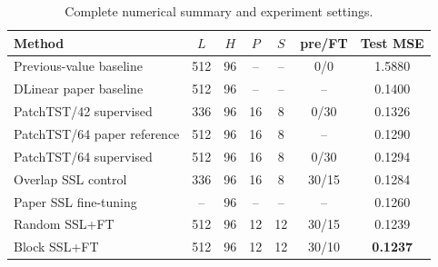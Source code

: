 \documentclass[11pt,twocolumn]{article}
\begin{document}
\begin{table}[H]
\centering
\scriptsize
\caption{Complete numerical summary and experiment settings.}
\label{tab:complete_results}
\begin{tabular}{lcccccc}
\toprule
Method & $L$ & $H$ & $P$ & $S$ & pre/FT & Test MSE \\
\midrule
Previous-value baseline & 512 & 96 & -- & -- & 0/0 & 1.5880 \\
DLinear paper baseline & 512 & 96 & -- & -- & -- & 0.1400 \\
PatchTST/42 supervised & 336 & 96 & 16 & 8 & 0/30 & 0.1326 \\
PatchTST/64 paper reference & 512 & 96 & 16 & 8 & -- & 0.1290 \\
PatchTST/64 supervised & 512 & 96 & 16 & 8 & 0/30 & 0.1294 \\
Overlap SSL control & 336 & 96 & 16 & 8 & 30/15 & 0.1284 \\
Paper SSL fine-tuning & -- & 96 & -- & -- & -- & 0.1260 \\
Random SSL+FT & 512 & 96 & 12 & 12 & 30/15 & 0.1239 \\
Block SSL+FT & 512 & 96 & 12 & 12 & 30/10 & \textbf{0.1237} \\
\bottomrule
\end{tabular}
\end{table}
\end{document}
